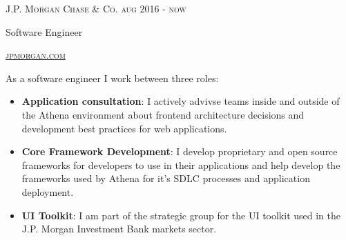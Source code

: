 {
  \textsc{\small{J.P. Morgan Chase \& Co. 
      \hfill
          {\raggedleft
              aug 2016 - now
          } \\
      }
  }
  {\raggedright\large {
   Software Engineer
  } \\}

  \textsc{\small\href{http://www.jpmorgan.com}{jpmorgan.com}}

  \normalsize{\raggedright
    As a software engineer I work between three roles:
    \begin{itemize}
    \item \textbf{Application consultation}: I actively advivse teams inside and outside of the Athena environment
        about frontend architecture decisions and development best practices for web applications.
    \item \textbf{Core Framework Development}: I develop proprietary and open source frameworks for developers 
        to use in their applications and help develop the frameworks used by Athena for it's SDLC processes 
        and application deployment.
    \item \textbf{UI Toolkit}: I am part of the strategic group for the UI toolkit used in the J.P. Morgan Investment
        Bank markets sector.
    \end{itemize}
  }
}